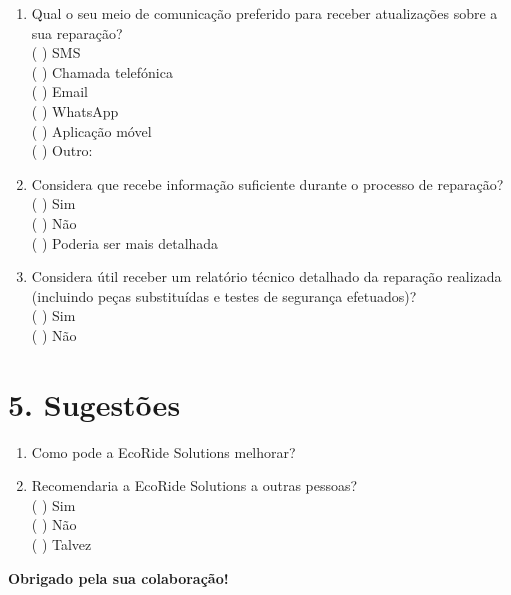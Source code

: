 \documentclass[11pt,a4paper]{article}
\begin{document}
\begin{enumerate}[leftmargin=*, resume]

\item Qual o seu meio de comunicação preferido para receber atualizações sobre a sua reparação? \\
( ) SMS \\
( ) Chamada telefónica \\
( ) Email \\
( ) WhatsApp \\
( ) Aplicação móvel \\
( ) Outro: \\

\item Considera que recebe informação suficiente durante o processo de reparação? \\
( ) Sim \\
( ) Não \\
( ) Poderia ser mais detalhada \\

\item Considera útil receber um relatório técnico detalhado da reparação realizada (incluindo peças substituídas e testes de segurança efetuados)? \\
( ) Sim \\
( ) Não \\

\end{enumerate}

\vspace{0.5cm}

\section*{5. Sugestões}

\begin{enumerate}[leftmargin=*, resume]
\item Como pode a EcoRide Solutions melhorar?

\par\vspace{0.5cm}

\noindent
\hspace*{-\leftmargin}
\framebox[\textwidth]{\rule{0pt}{80pt}}

\vspace{0.5cm}

\item Recomendaria a EcoRide Solutions a outras pessoas? \\
( ) Sim \\
( ) Não \\
( ) Talvez \\

\end{enumerate}

\vfill

\noindent
\textbf{Obrigado pela sua colaboração!}
\end{document}

